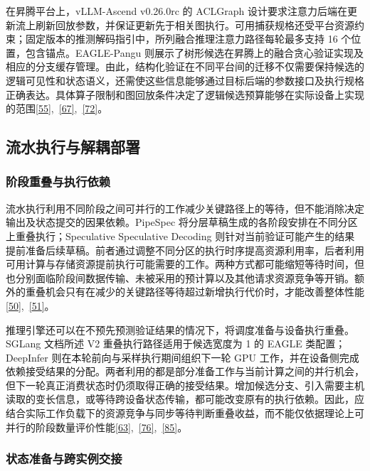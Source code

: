 \documentclass[11pt,a4paper,UTF8,fontset=none,scheme=plain,zihao=-4]{ctexart}
\begin{document}
在昇腾平台上，vLLM-Ascend v0.26.0rc 的 ACLGraph
设计要求注意力后端在更新流上刷新回放参数，并保证更新先于相关图执行。可用捕获规格还受平台资源约束；固定版本的推测解码指引中，所列融合推理注意力路径每轮最多支持
16 个位置，包含锚点。EAGLE-Pangu
则展示了树形候选在昇腾上的融合贪心验证实现及相应的分支缓存管理。由此，结构化验证在不同平台间的迁移不仅需要保持候选的逻辑可见性和状态语义，还需使这些信息能够通过目标后端的参数接口及执行规格正确表达。具体算子限制和图回放条件决定了逻辑候选预算能够在实际设备上实现的范围\protect\hyperlink{ref-ascendgraphdocs}{{[}55{]}},~\protect\hyperlink{ref-eaglepangu}{{[}67{]}},~\protect\hyperlink{ref-ascenddocs}{{[}72{]}}。

\hypertarget{section-6-3}{%
\subsection{流水执行与解耦部署}\label{section-6-3}}

\hypertarget{section-6-3-1}{%
\subsubsection{阶段重叠与执行依赖}\label{section-6-3-1}}

流水执行利用不同阶段之间可并行的工作减少关键路径上的等待，但不能消除决定输出及状态提交的因果依赖。PipeSpec
将分层草稿生成的各阶段安排在不同分区上重叠执行；Speculative Speculative
Decoding
则针对当前验证可能产生的结果提前准备后续草稿。前者通过调整不同分区的执行时序提高资源利用率，后者利用可用计算与存储资源提前执行可能需要的工作。两种方式都可能缩短等待时间，但也分别面临阶段间数据传输、未被采用的预计算以及其他请求资源竞争等开销。额外的重叠机会只有在减少的关键路径等待超过新增执行代价时，才能改善整体性能\protect\hyperlink{ref-pipespec}{{[}50{]}},~\protect\hyperlink{ref-ssd}{{[}51{]}}。

推理引擎还可以在不预先预测验证结果的情况下，将调度准备与设备执行重叠。SGLang
文档所述 V2 重叠执行路径适用于候选宽度为 1 的 EAGLE 类配置；DeepInfer
则在本轮前向与采样执行期间组织下一轮 GPU
工作，并在设备侧完成依赖接受结果的分配。两者利用的都是部分准备工作与当前计算之间的并行机会，但下一轮真正消费状态时仍须取得正确的接受结果。增加候选分支、引入需要主机读取的变长信息，或等待跨设备状态传输，都可能改变原有的执行依赖。因此，应结合实际工作负载下的资源竞争与同步等待判断重叠收益，而不能仅依据理论上可并行的阶段数量评价性能\protect\hyperlink{ref-sglangdocs}{{[}63{]}},~\protect\hyperlink{ref-ascend-pin}{{[}76{]}},~\protect\hyperlink{ref-deepinferdocs}{{[}85{]}}。

\hypertarget{section-6-3-2}{%
\subsubsection{状态准备与跨实例交接}\label{section-6-3-2}}
\end{document}
